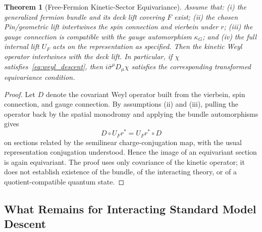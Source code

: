 \documentclass[11pt]{article}
\theoremstyle{canonmath}
\newtheorem{theorem}{Theorem}[section]
\theoremstyle{canonpostulate}
\theoremstyle{canonclaim}
\begin{document}
\begin{theorem}[Free-Fermion Kinetic-Sector Equivariance] \label{thm:dirac_comm}
Assume that: (i) the generalized fermion bundle and its deck lift covering $F$ exist; (ii) the chosen Pin/geometric lift intertwines the spin connection and vierbein under $r$; (iii) the gauge connection is compatible with the gauge automorphism $\kappa_G$; and (iv) the full internal lift $U_F$ acts on the representation as specified. Then the kinetic Weyl operator intertwines with the deck lift. In particular, if $\chi$ satisfies~\eqref{eq:weyl_descent}, then $i\bar\sigma^\mu D_\mu\chi$ satisfies the corresponding transformed equivariance condition.
\end{theorem}
\begin{proof}
Let $D$ denote the covariant Weyl operator built from the vierbein, spin connection, and gauge connection. By assumptions (ii) and (iii), pulling the operator back by the spatial monodromy and applying the bundle automorphisms gives
\begin{equation}
D\circ U_F r^* = U_F r^*\circ D
\end{equation}
on sections related by the semilinear charge-conjugation map, with the usual representation conjugation understood. Hence the image of an equivariant section is again equivariant. The proof uses only covariance of the kinetic operator; it does not establish existence of the bundle, of the interacting theory, or of a quotient-compatible quantum state.
\end{proof}

\subsection{What Remains for Interacting Standard Model Descent}
\end{document}

